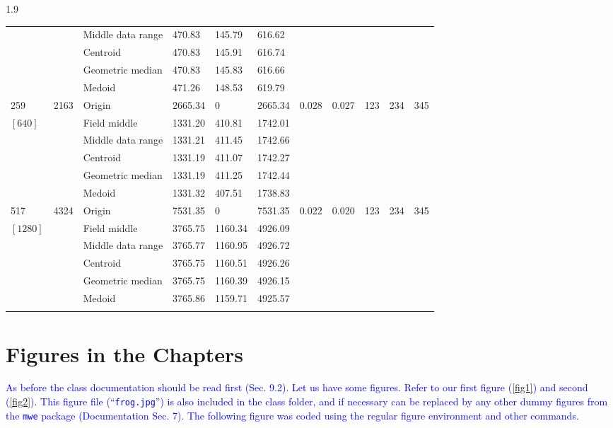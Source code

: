 \documentclass[phd]{ndsu-thesis-2022}
\newcommand\myspacing{1.9} %
\newcommand\italk[1]{\textcolor{blue}{#1}}  %
\begin{document}
\begin{spacing}{\myspacing}
\begin{landscape}
{{\begin{ThreePartTable}
\begin{longtable}{lll lll ll rrr}
 &  & Middle data range  & 470.83 & 145.79 & 616.62 \\
 &  & Centroid & 470.83 & 145.91 & 616.74 \\
 &  & Geometric median & 470.83 & 145.83 & 616.66 \\
 &  & Medoid  & 471.26 & 148.53 & 619.79 \\
\midrule
259 & 2163 & Origin  & 2665.34 & 0 & 2665.34 & 0.028 & 0.027 & 123 & 234 & 345 \\
$[640]$ &  & Field middle  & 1331.20 & 410.81 & 1742.01 \\
 &  & Middle data range  & 1331.21 & 411.45 & 1742.66 \\
 &  & Centroid & 1331.19 & 411.07 & 1742.27 \\
 &  & Geometric median & 1331.19 & 411.25 & 1742.44 \\
 &  & Medoid  & 1331.32 & 407.51 & 1738.83 \\
\midrule
517 & 4324 & Origin  & 7531.35 & 0 & 7531.35 & 0.022 & 0.020 & 123 & 234 & 345 \\
$[1280]$ &  & Field middle  & 3765.75 & 1160.34 & 4926.09 \\
 &  & Middle data range  & 3765.77 & 1160.95 & 4926.72 \\
 &  & Centroid & 3765.75 & 1160.51 & 4926.26 \\
 &  & Geometric median & 3765.75 & 1160.39 & 4926.15 \\
 &  & Medoid  & 3765.86 & 1159.71 & 4925.57 \\
\label{longtabls} %
\end{longtable} 
\end{ThreePartTable}
}
}
\end{landscape}

\setlength{\parindent}{0.5in}
\vspace{-2ex}



\section{Figures in the Chapters}
\italk{As before the class documentation should be read first (Sec. 9.2). Let us have some figures. Refer to our first figure (\cref{fig1}) and second (\cref{fig2}). This figure file (``\texttt{frog.jpg}'') is also included in the class folder, and if necessary can be replaced by any other dummy figures from the \texttt{mwe} package (Documentation Sec. 7). The following figure was coded using the regular figure environment and other commands.}


\end{spacing}
\end{document}
